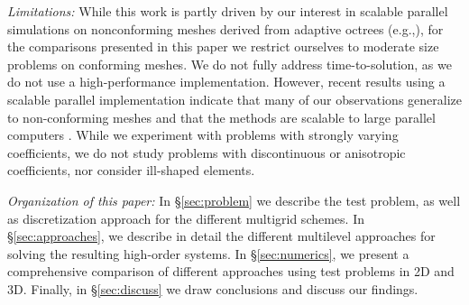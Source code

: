\documentclass[times]{nlaauth}
\newcommand{\gsnote}[1]{\textcolor{blue}{GS: #1}}
\begin{document}
{\em Limitations:} While this work is partly driven by our interest in
scalable parallel simulations on nonconforming meshes derived from
adaptive octrees (e.g.,\cite{SundarBirosBursteddeEtAl12}), 
 for the comparisons
presented in this paper we restrict ourselves to moderate size
problems on conforming meshes. We do not fully address time-to-solution, as
we do not use a high-performance implementation. However, recent
results using a scalable parallel implementation indicate that many of
our observations generalize to non-conforming meshes and that the
methods are scalable to large parallel computers \cite{IPDPS14}. While we
experiment with problems with strongly varying coefficients, we do not
study problems with discontinuous or anisotropic coefficients, nor consider
ill-shaped elements.

{\em Organization of this paper:} In \S\ref{sec:problem} we describe
the test problem, as well as discretization approach for the different
multigrid schemes. In \S\ref{sec:approaches}, we describe in detail
the different multilevel approaches for solving the resulting
high-order systems. In \S\ref{sec:numerics}, we present a
comprehensive comparison of different approaches using test problems
in 2D and 3D. Finally, in \S\ref{sec:discuss} we draw conclusions and
discuss our findings.




\end{document}
